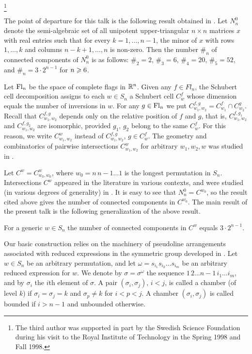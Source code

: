 \thanks{The third author was supported in part by the Swedish Science
Foundation during his visit to the Royal Institute of Technology in the
Spring 1998 and Fall 1998.}
\endthanks
{}\endkeywords
\endtopmatter

\document

The point of departure for this talk is the following result
obtained in \cite{SSV2, SSV3}.
Let $N_n^0$ denote the semi-algebraic set of all unipotent
upper-triangular $n \times n$ matrices $x$ with real entries such that
for every $k =1,\ldots, n-1$, the minor of $x$ with rows $1,\ldots,k$ and 
columns $n-k+1,\ldots,n$ is non-zero. Then the number $\#_n$ of connected 
components of $N_n^0$ is as follows: $\#_2 = 2$, $\#_3 = 6$, $\#_4 = 20$, 
$\#_5 = 52$, and $\#_n = 3\cdot2^{n-1}$ for $n \geqslant 6$.

Let $\operatorname{Fl}_n$ be the space of complete flags in $\Bbb R^n$. Given any $f\in Fl_n$,
the Schubert cell decomposition assigns to each $w\in S_n$ a Schubert cell
$C_w^f$ whose dimension equals the number of inversions in $w$. For any
$g\in\operatorname{Fl}_n$ we put $C_{w_1,w_2}^{f,g}=C_{w_1}^f\cap C_{w_2}^g$. Recall that
$C_{w_1,w_2}^{f,g}$ depends only on the relative position of $f$ and $g$,
that is, $C_{w_1,w_2}^{f,g_1}$ and $C_{w_1,w_2}^{f,g_2}$ are isomorphic,
provided $g_1$, $g_2$ belong  to the same $C_w^f$. For this reason, we 
write $C_{w_1,w_2}^w$ instead of $C_{w_1,w_2}^{f,g}$, $g\in C_w^f$. The
geometry and combinatorics of pairwise intersections  $C_{w_1,w_2}^w$
for arbitrary $w_1,w_2,w$ was studied in \cite{SSV1}.

Let $C^w=C_{w_0,w_0}^w$, where $w_0=n\, n-1 \dots 1$ is the longest 
permutation in $S_n$. Intersections $C^w$ appeared in the literature in
various contexts, and were studied (in various degrees of generality)
in \cite{BFZ,BZ,R1,R2}. It is easy to see that
$N_n^0=C^{w_0}$, so the result cited above gives the number of
connected components in $C^{w_0}$. The main result of the present talk is the 
following generalization of the above result. 

 For a generic $w\in S_n$ the number of connected 
components in $C^w$ equals $3\cdot 2^{n-1}$.
\endproclaim

Our basic construction relies on the machinery of pseudoline arrangements
associated with reduced expressions in the symmetric group developed
in \cite{BFZ}. Let $w\in S_n$ be an arbitrary permutation, and let
$\omega=s_{i_1}s_{i_2}\dots s_{i_m}$ be an arbitrary reduced expression
for $w$. We denote by $\sigma=\sigma^\omega$ the sequence 
$1\, 2\dots n-1\, i_1\dots i_m$, 
and by $\sigma_i$ the $i$th element of $\sigma$.
A pair $(\sigma_i,\sigma_j)$, $i<j$, is called a chamber (of level $k$) if 
$\sigma_i=\sigma_j=k$ and $\sigma_p\ne k$ for $i<p<j$. A chamber 
$(\sigma_i,\sigma_j)$ is called bounded if $i>n-1$ and unbounded otherwise.

